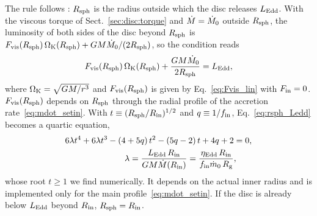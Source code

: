 The rule  follows \citet{Lipunova1999}: $R_{\rm sph}$ is the radius outside which the disc releases $L_{\rm Edd}$.
With the viscous torque of Sect.~\ref{sec:disc:torque} and $\dot M = \dot M_0$ outside $R_{\rm sph}$, the luminosity of both sides of the disc beyond $R_{\rm sph}$ is $F_{\rm vis}(R_{\rm sph})\,\Omega_{\rm K}(R_{\rm sph}) + G M \dot M_0/(2R_{\rm sph})$, so the condition reads
\begin{equation}
F_{\rm vis}(R_{\rm sph})\,\Omega_{\rm K}(R_{\rm sph}) + \frac{G M \dot M_0}{2R_{\rm sph}} = L_{\rm Edd} ,
\label{eq:rsph_Ledd}
\end{equation}
where $\Omega_{\rm K} = \sqrt{GM/r^3}$ and $F_{\rm vis}(R_{\rm sph})$ is given by Eq.~\eqref{eq:Fvis_lin} with $F_{\rm in} = 0$.
$F_{\rm vis}(R_{\rm sph})$ depends on $R_{\rm sph}$ through the radial profile of the accretion rate~\eqref{eq:mdot_setin}.
With $t \equiv (R_{\rm sph}/R_{\rm in})^{1/2}$ and $q \equiv 1/f_{\rm in}$, Eq.~\eqref{eq:rsph_Ledd} becomes a quartic equation,
\begin{equation}
\begin{split}
6\lambda t^4 + 6\lambda t^3 - (4 + 5q)\,t^2 - (5q - 2)\,t + 4q + 2 &= 0, \\
\lambda = \frac{L_{\rm Edd}\,R_{\rm in}}{GM\dot M(R_{\rm in})} = \frac{\eta_{\rm Edd}\,R_{\rm in}}{f_{\rm in}\dot m_0\,R_{\rm g}} & ,
\end{split}
\label{eq:rsph_quartic}
\end{equation}
whose root $t \ge 1$ we find numerically.
It depends on the actual inner radius and is implemented only for the main profile~\eqref{eq:mdot_setin}.
If the disc is already below $L_{\rm Edd}$ beyond $R_{\rm in}$, $R_{\rm sph} = R_{\rm in}$.


